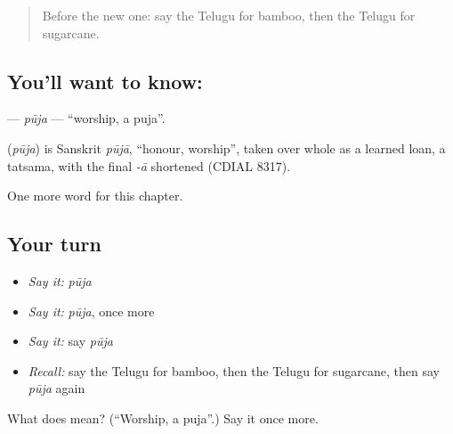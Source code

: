 \label{lesson:TE-C303-puja}



\begin{quote}
Before the new one: say the Telugu for bamboo, then the Telugu for sugarcane.
\end{quote}

\subsection*{You'll want to know: }
\textbf{} — \emph{pūja} — \textquotedblleft{}worship, a puja\textquotedblright{}.

\begin{cousinweb}
\textbf{} (\emph{pūja}) is Sanskrit \emph{pūjā}, \textquotedblleft{}honour, worship\textquotedblright{}, taken over whole as a learned loan, a tatsama, with the final \emph{-ā} shortened (CDIAL 8317).
\end{cousinweb}

\begin{grammarlens}[title={What you've built}]
One more word for this chapter.
\end{grammarlens}

\subsection*{Your turn}
\begin{itemize}
\raggedright
  \item \emph{Say it:} \emph{pūja}
  \item \emph{Say it:} \emph{pūja}, once more
  \item \emph{Say it:} say \emph{pūja}
  \item \emph{Recall:} say the Telugu for bamboo, then the Telugu for sugarcane, then say \emph{pūja} again
\end{itemize}

\begin{tcolorbox}[breakable,colback=teal!4,colframe=teal!35!black,title={Before you move on}]
What does  mean? (\textquotedblleft{}Worship, a puja\textquotedblright{}.) Say it once more.
\end{tcolorbox}
